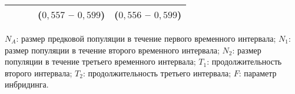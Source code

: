 \begin{table}[ht]
{\begin{tabular}{|l|c|c|c|c|}
        & & & ($0{,}557$ -- $0{,}599$) & ($0{,}556$ -- $0{,}599$) \\
        \hline
    \end{tabular}%
    }
    \begin{tablenotes}
      \footnotesize
      \item $N_A$: размер предковой популяции в течение первого временного интервала; $N_{1}$: размер популяции в течение второго временного интервала; $N_{2}$: размер популяции в течение третьего временного интервала; $T_1$: продолжительность второго интервала; $T_2$: продолжительность третьего интервала;  $F$: параметр инбридинга.
    \end{tablenotes}
    \label{tab:app1:cabbage:results}
\end{table}
